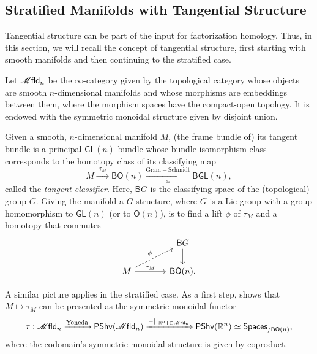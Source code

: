 \documentclass[../text]{subfiles}
\begin{document}
\subsection{Stratified Manifolds with Tangential Structure}

Tangential structure can be part of the input for factorization homology. Thus, in this section, we will recall the concept of tangential structure, first starting with smooth manifolds and then continuing to the stratified case.

\begin{definition}
    Let $\mfld_n$ be the $\infty$-category given by the topological category whose objects are smooth $n$-dimensional manifolds and whose morphisms are embeddings between them, where the morphism spaces have the compact-open topology. It is endowed with the symmetric monoidal structure given by disjoint union.
\end{definition}

Given a smooth, $n$-dimensional manifold $M$, (the frame bundle of) its tangent bundle is a principal $\mathsf{GL}(n)$-bundle whose bundle isomorphism class corresponds to the homotopy class of its classifying map
%
\begin{equation}
    M \xrightarrow{\ \ \tau_M \ \ } \mathsf{BO}(n) \xrightarrow[\simeq]{\mathrm{Gram-Schmidt}} \mathsf{BGL}(n),
\end{equation}
called the \emph{tangent classifier}. Here, $\mathsf{B}G$ is the classifying space of the (topological) group $G$. Giving the manifold a $G$-structure, where $G$ is a Lie group with a group homomorphism to $\mathsf{GL}(n)$ (or to $\mathsf{O}(n)$), is to find a lift $\phi$ of $\tau_M$ and a homotopy that commutes
%
\begin{equation}
    \begin{tikzcd}[column sep = large]
        & \mathsf{B}G \arrow[d] \\
        M \arrow[ru, dashed, "\phi"] \arrow[r, "\tau_M"] & \mathsf{BO}(n).
    \end{tikzcd}
\end{equation}

A similar picture applies in the stratified case. As a first step, \cite[Corollary 2.13]{af_fhtop} shows that $M\mapsto\tau_M$ can be presented as the symmetric monoidal functor
%
\begin{equation}
    \tau: \mfld_n \xrightarrow{\mathrm{Yoneda}} \mathsf{PShv}(\mfld_n) \xrightarrow{-|_{\{\mathbb{R}^n\} \subset \mfld_n}} \mathsf{PShv}(\mathbb{R}^n) \simeq \mathsf{Spaces}_{/\mathsf{BO}(n)},
\end{equation}
where the codomain's symmetric monoidal structure is given by coproduct. 
\end{document}

